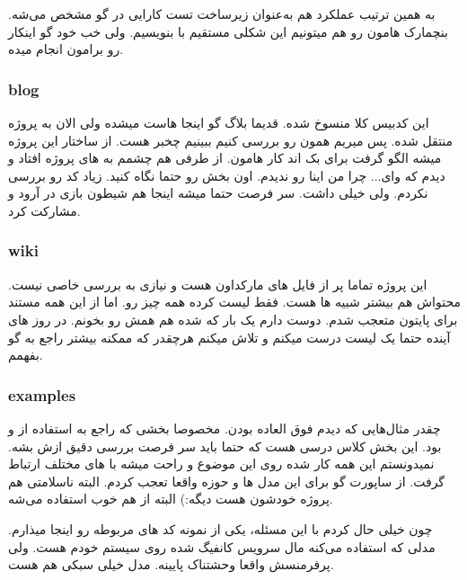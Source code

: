 به همین ترتیب عملکرد  هم به‌عنوان زیرساخت تست کارایی در گو مشخص می‌شه. بنچمارک هامون رو هم میتونیم
این شکلی مستقیم با  بنویسیم. ولی خب خود گو اینکار رو برامون انجام میده.

\subsubsection{blog}
این کدبیس کلا منسوخ شده. قدیما بلاگ گو اینجا هاست میشده ولی الان به پروژه   منتقل شده.
پس میریم همون رو بررسی کنیم ببینیم چخبر هست. از ساختار این پروژه میشه الگو گرفت برای بک اند کار هامون.
از طرفی هم چشمم به  های پروژه افتاد و دیدم که وای... چرا من اینا رو ندیدم. اون بخش رو حتما نگاه کنید.
زیاد کد رو بررسی نکردم. ولی  خیلی داشت. سر فرصت حتما میشه اینجا هم شیطون بازی در آرود و مشارکت کرد.



\subsubsection{wiki}
این پروژه تماما پر از فایل های مارکداون هست و نیازی به بررسی خاصی نیست. محتواش هم بیشتر شبیه  ها هست.
فقط لیست کرده همه چیز رو. اما از این همه مستند برای پایتون متعجب شدم. دوست دارم یک بار که شده هم همش رو بخونم.
در روز های آینده حتما یک لیست درست میکنم و تلاش میکنم هرچقدر که ممکنه بیشتر راجع به گو بفهمم.

\subsubsection{examples}
چقدر مثال‌هایی که دیدم فوق العاده بودن. مخصوصا بخشی که راجع به استفاده از  و  بود.
این بخش کلاس درسی هست که حتما باید سر فرصت بررسی دقیق ازش بشه. نمیدونستم این همه کار شده روی این موضوع
و راحت میشه با  های مختلف ارتباط گرفت. از ساپورت گو برای این مدل ها و حوزه واقعا تعجب کردم.
البته ناسلامتی  هم پروژه خودشون هست دیگه:) البته از  هم خوب استفاده می‌شه.

چون خیلی حال کردم با این مسئله، یکی از نمونه کد های مربوطه رو اینجا میذارم. مدلی که استفاده می‌کنه مال سرویس  کانفیگ
شده روی سیستم خودم هست. ولی پرفرمنسش واقعا وحشتناک پایینه. مدل خیلی سبکی هم هست.

